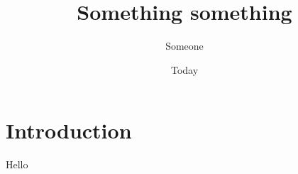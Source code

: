 
\usepackage{graphicx}
\usepackage[scale=.8]{geometry}
\usepackage{microtype}

\title{Something something}
\author{Someone}
\date{Today}


    \maketitle

    \section{Introduction}
    Hello

